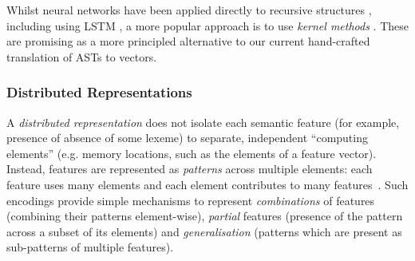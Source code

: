 Whilst neural networks have been applied directly to recursive structures
\cite{goller1996learning}, including using LSTM \cite{zhu2015long}, a more
popular approach is to use \emph{kernel methods}
\cite{bakir2007predicting}. These are promising as a more principled alternative
to our current hand-crafted translation of ASTs to vectors.

\subsubsection{Distributed Representations}

A \emph{distributed representation} does not isolate each semantic feature (for
example, presence of absence of some lexeme) to separate, independent
``computing elements'' (e.g. memory locations, such as the elements of a feature
vector). Instead, features are represented as \emph{patterns} across multiple
elements: each feature uses many elements and each element contributes to many
features~\cite{hinton1984distributed}. Such encodings provide simple mechanisms
to represent \emph{combinations} of features (combining their patterns
element-wise), \emph{partial} features (presence of the pattern across a subset
of its elements) and \emph{generalisation} (patterns which are present as
sub-patterns of multiple features).




